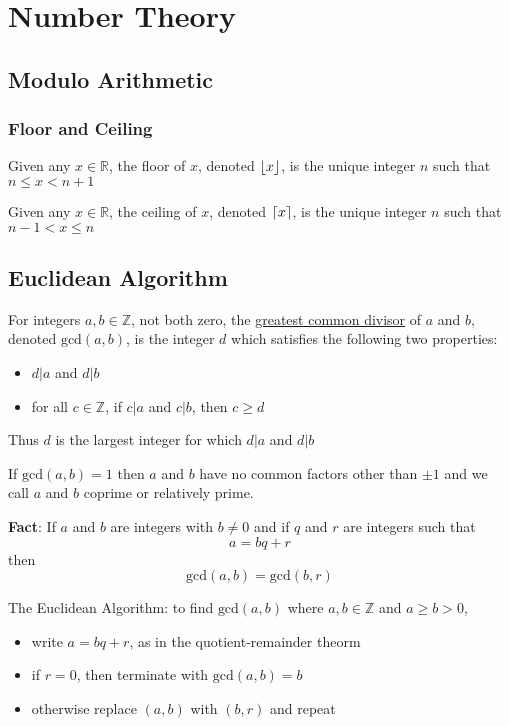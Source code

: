 \section{Number Theory}
\subsection{Modulo Arithmetic}
\subsubsection{Floor and Ceiling}
\begin{definition}
	Given any $x\in\mathbb R$, the floor of $x$, denoted $\lfloor x\rfloor$, is the unique integer $n$ such that $n \leq x < n + 1$

	Given any $x\in\mathbb R$, the ceiling of $x$, denoted $\lceil x\rceil$, is the unique integer $n$ such that $n-1 < x \leq n$
\end{definition}

\subsection{Euclidean Algorithm}
\begin{definition}
    For integers $a,b\in\mathbb Z$, not both zero, the \underline{greatest common divisor} of $a$ and $b$, denoted $\text{gcd}\left(a,b\right)$, is the integer $d$ which satisfies the following two properties:
    \begin{itemize}
        \item $d|a$ and $d|b$
        \item for all $c\in\mathbb Z$, if $c|a$ and $c|b$, then $c\geq d$
    \end{itemize}
    Thus $d$ is the largest integer for which $d|a$ and $d|b$
\end{definition}

If $\text{gcd}\left(a,b\right) = 1$ then $a$ and $b$ have no common factors other than $\pm 1$ and we call $a$ and $b$ coprime or relatively prime.

\textbf{Fact}: If $a$ and $b$ are integers with $b\neq 0$ and if $q$ and $r$ are integers such that $$a = bq + r$$ then $$\text{gcd}\left(a,b\right) = \text{gcd}\left(b,r\right)$$

\begin{definition}
    The Euclidean Algorithm: to find $\text{gcd}\left(a,b\right)$ where $a,b\in\mathbb Z$ and $a\geq b>0$,
    \begin{itemize}
        \item write $a=bq+r$, as in the quotient-remainder theorm
        \item if $r=0$, then terminate with $\text{gcd}\left(a,b\right)=b$
        \item otherwise replace $\left(a,b\right)$ with $\left(b,r\right)$ and repeat
    \end{itemize}
\end{definition}

